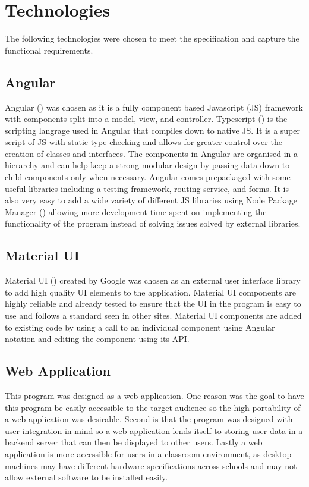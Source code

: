 \documentclass{l4proj}
\begin{document}
\section{Technologies}
The following technologies were chosen to meet the specification and capture the functional requirements.

\subsection{Angular}
Angular (\cite{noauthor_angular_nodate-1}) was chosen as it is a fully component based Javascript (JS) framework with components split into a model, view, and controller. Typescript (\cite{noauthor_typed_nodate}) is the scripting langrage used in Angular that compiles down to native JS. It is a super script of JS with static type checking and allows for greater control over the creation of classes and interfaces. The components in Angular are organised in a hierarchy and can help keep a strong modular design by passing data down to child components only when necessary. Angular comes prepackaged with some useful libraries including a testing framework, routing service, and forms. It is also very easy to add a wide variety of different JS libraries using Node Package Manager (\cite{noauthor_npm_nodate}) allowing more development time spent on implementing the functionality of the program instead of solving issues solved by external libraries.

\subsection{Material UI}
Material UI (\cite{material}) created by Google was chosen as an external user interface library to add high quality UI elements to the application. Material UI components are highly reliable and already tested to ensure that the UI in the program is easy to use and follows a standard seen in other sites. Material UI components are added to existing code by using a call to an individual component using Angular notation and editing the component using its API.

\subsection{Web Application}
This program was designed as a web application. One reason was the goal to have this program be easily accessible to the target audience so the high portability of a web application was desirable. Second is that the program was designed with user integration in mind so a web application lends itself to storing user data in a backend server that can then be displayed to other users. Lastly a web application is more accessible for users in a classroom environment, as desktop machines may have different hardware specifications across schools and may not allow external software to be installed easily.
\end{document}
